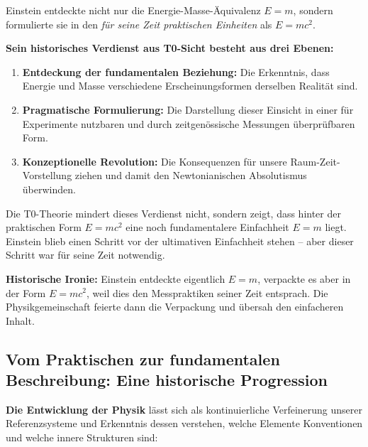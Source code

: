 	\begin{tcolorbox}[colback=green!10!white,colframe=green!75!black,title=Einsteins pragmatisches Genie neu interpretiert]
		Einstein entdeckte nicht nur die Energie-Masse-Äquivalenz \( E = m \), sondern formulierte sie in den \textit{für seine Zeit praktischen Einheiten} als \( E = mc^2 \).
		
		\textbf{Sein historisches Verdienst aus T0-Sicht besteht aus drei Ebenen:}
		
		\begin{enumerate}
			\item \textbf{Entdeckung der fundamentalen Beziehung:} Die Erkenntnis, dass Energie und Masse verschiedene Erscheinungsformen derselben Realität sind.
			
			\item \textbf{Pragmatische Formulierung:} Die Darstellung dieser Einsicht in einer für Experimente nutzbaren und durch zeitgenössische Messungen überprüfbaren Form.
			
			\item \textbf{Konzeptionelle Revolution:} Die Konsequenzen für unsere Raum-Zeit-Vorstellung ziehen und damit den Newtonianischen Absolutismus überwinden.
		\end{enumerate}
		
		Die T0-Theorie mindert dieses Verdienst nicht, sondern zeigt, dass hinter der praktischen Form \( E = mc^2 \) eine noch fundamentalere Einfachheit \( E = m \) liegt. Einstein blieb einen Schritt vor der ultimativen Einfachheit stehen – aber dieser Schritt war für seine Zeit notwendig.
		
		\textbf{Historische Ironie:} Einstein entdeckte eigentlich \( E = m \), verpackte es aber in der Form \( E = mc^2 \), weil dies den Messpraktiken seiner Zeit entsprach. Die Physikgemeinschaft feierte dann die Verpackung und übersah den einfacheren Inhalt.
	\end{tcolorbox}
	
	\subsection{Vom Praktischen zur fundamentalen Beschreibung: Eine historische Progression}
	
	\textbf{Die Entwicklung der Physik} lässt sich als kontinuierliche Verfeinerung unserer Referenzsysteme und Erkenntnis dessen verstehen, welche Elemente Konventionen und welche innere Strukturen sind:
	
